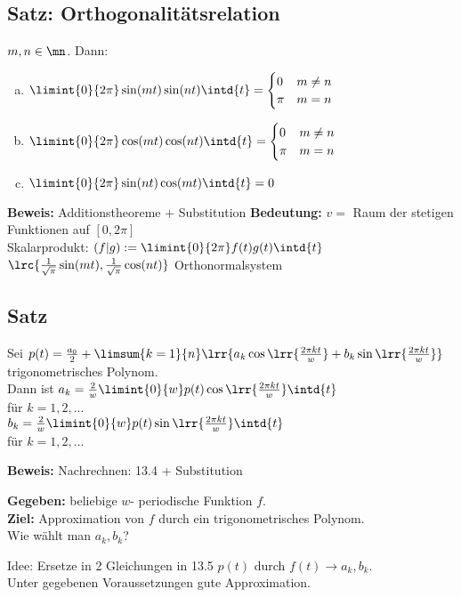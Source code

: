 \subsection{Satz: Orthogonalitätsrelation}
	$ m,n\in\mn $. Dann:
	\begin{enumerate}[a)]
	\item $ \limint{0}{2\pi}\sin(mt)\sin(nt)\intd{t}=\begin{cases}0&m\neq n\\\pi&m=n\end{cases} $
	\item $ \limint{0}{2\pi}\cos(mt)\cos(nt)\intd{t}=\begin{cases}0&m\neq n\\\pi&m=n\end{cases} $
	\item  $ \limint{0}{2\pi}\sin(nt)\cos(mt)\intd{t}=0 $
	\end{enumerate}
	\textbf{Beweis:} Additionstheoreme + Substitution
	\textbf{Bedeutung:} $ v= $ Raum der stetigen Funktionen auf $ [0,2\pi] $\\
	Skalarprodukt: $ (f|g):=\limint{0}{2\pi}f(t)g(t)\intd{t} $\\
	$ \lrc{\frac{1}{\sqrt{\pi}}\sin(mt),\frac{1}{\sqrt{\pi}}\cos(nt)} $ Orthonormalsystem
	
\subsection{Satz}
	Sei $ p(t)=\frac{a_0}{2}+\limsum{k=1}{n}\lrr{a_k\cos\lrr{\frac{2\pi kt}{w}}+b_k\sin\lrr{\frac{2\pi kt}{w}}} $ trigonometrisches Polynom.\\
	Dann ist $ a_k=\frac{2}{w}\limint{0}{w}p(t)\cos\lrr{\frac{2\pi kt}{w}}\intd{t} $\\
	für $ k=1,2,... $\\
	$ b_k=\frac{2}{w}\limint{0}{w}p(t)\sin\lrr{\frac{2\pi kt}{w}}\intd{t} $\\
	für $ k=1,2,... $
	
	\textbf{Beweis:} Nachrechnen: 13.4 + Substitution
	
	\textbf{Gegeben:} beliebige $ w $- periodische Funktion $ f $.\\
	\textbf{Ziel:} Approximation von $ f $ durch ein trigonometrisches Polynom.\\
	Wie wählt man $ a_k,b_k $?
	
	Idee: Ersetze in 2 Gleichungen in 13.5 $ p(t) $ durch $ f(t)\rightarrow a_k,b_k $.\\
	Unter gegebenen Voraussetzungen gute Approximation.
	
